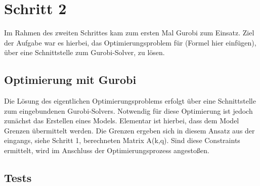 \section{Schritt 2}
Im Rahmen des zweiten Schrittes kam zum ersten Mal Gurobi zum Einsatz. Ziel der Aufgabe war es hierbei, das Optimierungsproblem für (Formel hier einfügen), über eine Schnittstelle zum Gurobi-Solver, zu lösen. \\

\subsection{Optimierung mit Gurobi}
Die Lösung des eigentlichen Optimierungsproblems erfolgt über eine Schnittstelle zum eingebundenen Gurobi-Solvers. Notwendig für diese Optimierung ist jedoch zunächst das Erstellen eines Models. Elementar ist hierbei, dass dem Model Grenzen übermittelt werden. Die Grenzen ergeben sich in diesem Ansatz aus der eingangs, siehe Schritt 1, berechneten Matrix A(k,q). Sind diese Constraints ermittelt, wird im Anschluss der Optimierungsprozess angestoßen. \\
	
\subsection{Tests}